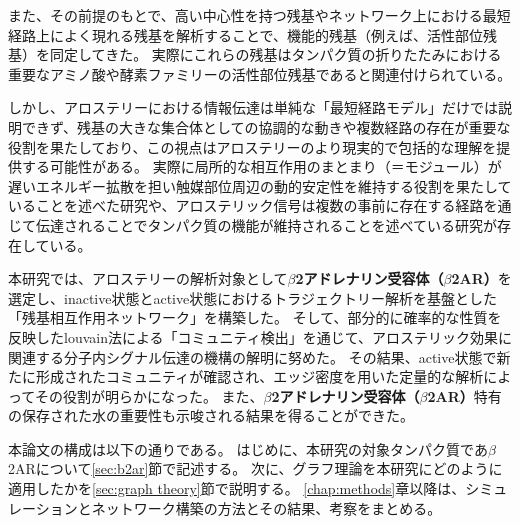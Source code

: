 また、その前提のもとで、高い中心性を持つ残基やネットワーク上における最短経路上によく現れる残基を解析することで、機能的残基（例えば、活性部位残基）を同定してきた。
実際にこれらの残基はタンパク質の折りたたみにおける重要なアミノ酸や酵素ファミリーの活性部位残基であると関連付けられている。

しかし、アロステリーにおける情報伝達は単純な「最短経路モデル」だけでは説明できず、残基の大きな集合体としての協調的な動きや複数経路の存在が重要な役割を果たしており、この視点はアロステリーのより現実的で包括的な理解を提供する可能性がある。
実際に局所的な相互作用のまとまり（＝モジュール）が遅いエネルギー拡散を担い触媒部位周辺の動的安定性を維持する役割を果たしていることを述べた研究や、アロステリック信号は複数の事前に存在する経路を通じて伝達されることでタンパク質の機能が維持されることを述べている研究が存在している。

本研究では、アロステリーの解析対象として\textbf{$\beta$2アドレナリン受容体（$\beta$2AR）}を選定し、inactive状態とactive状態におけるトラジェクトリー解析を基盤とした「残基相互作用ネットワーク」を構築した。
そして、部分的に確率的な性質を反映したlouvain法による「コミュニティ検出」を通じて、アロステリック効果に関連する分子内シグナル伝達の機構の解明に努めた。
その結果、active状態で新たに形成されたコミュニティが確認され、エッジ密度を用いた定量的な解析によってその役割が明らかになった。
また、\textbf{$\beta$2アドレナリン受容体（$\beta$2AR）}特有の保存された水の重要性も示唆される結果を得ることができた。

本論文の構成は以下の通りである。
はじめに、本研究の対象タンパク質であ$\beta$2ARについて\ref{sec:b2ar}節で記述する。
次に、グラフ理論を本研究にどのように適用したかを\ref{sec:graph theory}節で説明する。
\ref{chap:methods}章以降は、シミュレーションとネットワーク構築の方法とその結果、考察をまとめる。

